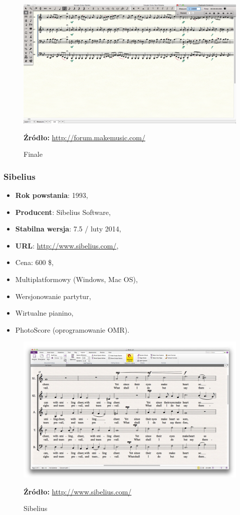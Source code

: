 \documentclass[polish,thesis,12pt]{dcsbook}
\newcommand{\source}[2]{
  	\caption*{\textbf{Źródło:} \href{#1}{{#2}}}
}
\begin{document}
\begin{figure}[H]
  \centering
  \includegraphics[scale=0.3,bb=0 0 1366 768]{img/finale.png}
  \caption{Finale}
  \label{finale}
  \source{http://forum.makemusic.com/default.aspx?f=6&m=410753}{http://forum.makemusic.com/}
\end{figure}

\subsubsection{Sibelius}
\begin{itemize}
  \item \textbf{Rok powstania}: 1993,
  \item \textbf{Producent}: Sibelius Software,
  \item \textbf{Stabilna wersja}: 7.5 / luty 2014,
  \item \textbf{URL}: \url{http://www.sibelius.com/},
  \item Cena: 600 \$,
  \item Multiplatformowy (Windows, Mac OS),
  \item Wersjonowanie partytur,
  \item Wirtualne pianino,
  \item PhotoScore (oprogramowanie OMR).
\end{itemize}

\begin{figure}[H]
  \centering
  \includegraphics[scale=0.25,bb=0 0 1800 1150]{img/sibelius.jpg}
  \caption{Sibelius}
  \label{sibelius}
  \source{http://www.sibelius.com/products/sibelius_first/students.html}{http://www.sibelius.com/}
\end{figure}
\end{document}
